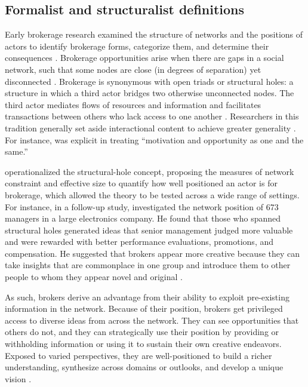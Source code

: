 \documentclass[
]{article}
\begin{document}
\subsection{Formalist and structuralist definitions}

Early brokerage research examined the structure of networks and the positions of actors to identify brokerage forms, categorize them, and determine their consequences \autocite{burtStructuralHolesSocial1992,burtStructuralHolesGood2004,gouldStructuresMediationFormal1989,granovetterStrengthWeakTies1973,marsdenBrokerageBehaviorRestricted1982,simmelConflictWebGroupAffiliations1964,simmelIndividualitySocialForms1971}. Brokerage opportunities arise when there are gaps in a social network, such that some nodes are close (in degrees of separation) yet disconnected \autocite{burtStructuralHolesSocial1992,burtStructuralHolesGood2004,marsdenBrokerageBehaviorRestricted1982}. Brokerage is synonymous with open triads or structural holes: a structure in which a third actor bridges two otherwise unconnected nodes. The third actor mediates flows of resources and information and facilitates transactions between others who lack access to one another \autocites[1457]{fernandezDilemmaStatePower1994}[202]{marsdenBrokerageBehaviorRestricted1982}. Researchers in this tradition generally set aside interactional content to achieve greater generality \autocite{eriksonFormalistRelationalistTheory2013}. For instance, \textcite[36]{burtStructuralHolesSocial1992} was explicit in treating ``motivation and opportunity as one and the same.''

\textcite{burtStructuralHolesSocial1992} operationalized the structural-hole concept, proposing the measures of network constraint and effective size to quantify how well positioned an actor is for brokerage, which allowed the theory to be tested across a wide range of settings. For instance, in a follow-up study, \textcite{burtStructuralHolesGood2004} investigated the network position of 673 managers in a large electronics company. He found that those who spanned structural holes generated ideas that senior management judged more valuable and were rewarded with better performance evaluations, promotions, and compensation. He suggested that brokers appear more creative because they can take insights that are commonplace in one group and introduce them to other people to whom they appear novel and original \autocite[388]{burtStructuralHolesGood2004}.

As such, brokers derive an advantage from their ability to exploit pre-existing information in the network. Because of their position, brokers get privileged access to diverse ideas from across the network. They can see opportunities that others do not, and they can strategically use their position by providing or withholding information \autocite{burtStructuralHolesSocial1992} or using it to sustain their own creative endeavors. Exposed to varied perspectives, they are well-positioned to build a richer understanding, synthesize across domains or outlooks, and develop a unique vision \autocite{burtStructuralHolesGood2004}.
\end{document}
